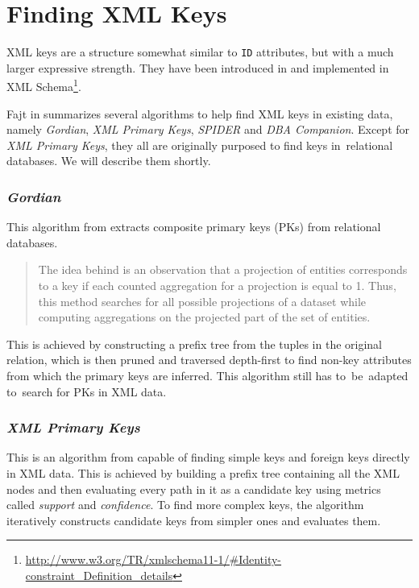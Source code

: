 \section{Finding XML Keys}

XML keys are a structure somewhat similar to \texttt{ID} attributes, but with a much larger expressive strength. They have been introduced in \cite{keX} and implemented in XML Schema\footnote{\url{http://www.w3.org/TR/xmlschema11-1/\#Identity-constraint\_Definition\_details}}.

Fajt in \cite{fajt} summarizes several algorithms to help find XML keys in existing data, namely \textit{Gordian}, \textit{XML Primary Keys}, \textit{SPIDER} and \textit{DBA Companion}. Except for \textit{XML Primary Keys}, they all are originally purposed to find keys in~relational databases. We will describe them shortly.

\subsubsection{\textit{Gordian}}

This algorithm from \cite{fajt-41} extracts composite primary keys (PKs) from relational databases.

\begin{quote}
The idea behind is an observation that a projection of entities corresponds to a key if each counted aggregation for a projection is equal to 1. Thus, this method searches for all possible projections of a dataset while computing aggregations on the projected part of the set of entities.
\end{quote}

This is achieved by constructing a prefix tree from the tuples in the original relation, which is then pruned and traversed depth-first to find non-key attributes from which the primary keys are inferred. This algorithm still has to~be~adapted to~search for PKs in XML data.

\subsubsection{\textit{XML Primary Keys}}

This is an algorithm from \cite{fajt-39} capable of finding simple keys and foreign keys directly in XML data. This is achieved by building a prefix tree containing all the XML nodes and then evaluating every path in it as a candidate key using metrics called \textit{support} and \textit{confidence}. To find more complex keys, the algorithm iteratively constructs candidate keys from simpler ones and evaluates them.\\

